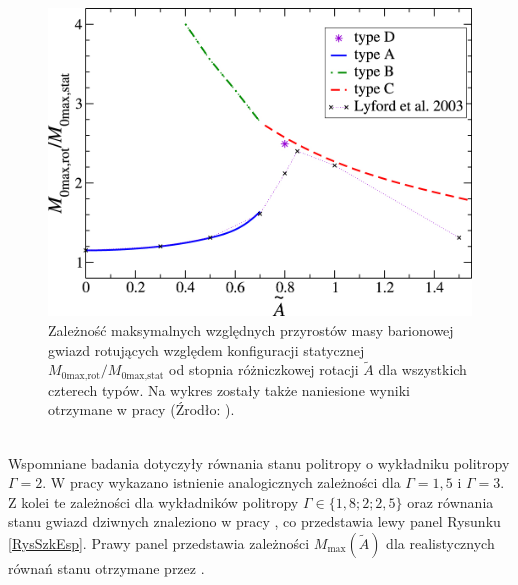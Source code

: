 \documentclass{bachelor_thesis}
\begin{document}
        \begin{figure}[h!]
            \centering
            \includegraphics[scale=1.35]{figures/RysMmaxofA.jpg}
            \caption{Zależność maksymalnych względnych przyrostów masy barionowej gwiazd rotujących względem konfiguracji statycznej $M_{0\textrm{max,rot}}/M_{0\textrm{max,stat}}$ od stopnia różniczkowej rotacji $\tilde{A}$ dla wszystkich czterech typów. Na wykres zostały także naniesione wyniki otrzymane w pracy \cite{Lyford2003} (Źrodło: \citealp{Rosinska2017}).}
            \label{RysMmaxofA}
        \end{figure}\\
        Wspomniane badania dotyczyły równania stanu politropy o wykładniku politropy $\Gamma=2$. W pracy \cite{Studzinska2016} wykazano istnienie analogicznych zależności dla $\Gamma=1,5$ i $\Gamma=3$. Z kolei te zależności dla wykładników politropy $\Gamma\in\{1,8;2;2,5\}$ oraz równania stanu gwiazd dziwnych znaleziono w pracy \cite{Szkudlarek2019}, co przedstawia lewy panel Rysunku \ref{RysSzkEsp}. Prawy panel przedstawia zależności $M_\textrm{max}(\tilde{A})$ dla realistycznych równań stanu otrzymane przez \cite{Espino2019}.
\end{document}
